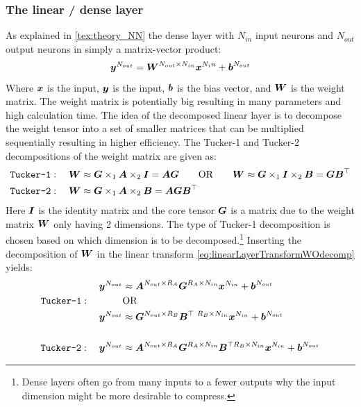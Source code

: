\subsubsection{The linear / dense layer}
As explained in \autoref{tex:theory_NN} the dense layer with $N_{in}$ input neurons and $N_{out}$ output neurons in simply a matrix-vector product:
\begin{equation}
    \boldsymbol{y}^{N_{out}} = \boldsymbol{W}^{N_{out}\times N_{in}}\boldsymbol{x}^{N_in} + \boldsymbol{b}^{N_{out}}
    \label{eq:linearLayerTransformWOdecomp}
\end{equation}
Where $\boldsymbol{x}$ is the input, $\boldsymbol{y}$ is the input, $\boldsymbol{b}$ is the bias vector, and $\boldsymbol{W}$ is the weight matrix. The weight matrix is potentially big resulting in many parameters and high calculation time. The idea of the decomposed linear layer is to decompose the weight tensor into a set of smaller matrices that can be multiplied sequentially resulting in higher efficiency. The Tucker-1 and Tucker-2 decompositions of the weight matrix are given as:
\begin{align}
\texttt{Tucker-1}&: \quad \boldsymbol{W} \approx \boldsymbol{G} \times_1 \boldsymbol{A} \times_2 \boldsymbol{I} = \boldsymbol{A}\boldsymbol{G} \qquad \text{OR} \qquad \boldsymbol{W} \approx \boldsymbol{G} \times_1 \boldsymbol{I} \times_2 \boldsymbol{B} = \boldsymbol{G}\boldsymbol{B}^\top \\
\texttt{Tucker-2}&: \quad \boldsymbol{W} \approx \boldsymbol{G} \times_1 \boldsymbol{A} \times_2 \boldsymbol{B} = \boldsymbol{A}\boldsymbol{G}\boldsymbol{B}^\top 
\end{align}
Here $\boldsymbol{I}$ is the identity matrix and the core tensor $\boldsymbol{G}$ is a matrix due to the weight matrix $\boldsymbol{W}$ only having 2 dimensions. The type of Tucker-1 decomposition is chosen based on which dimension is to be decomposed.\footnote{Dense layers often go from many inputs to a fewer outputs why the input dimension might be more desirable to compress.} Inserting the decomposition of $\boldsymbol{W}$ in the linear transform \eqref{eq:linearLayerTransformWOdecomp} yields:
\begin{align}
     \boldsymbol{y}^{N_{out}} &\approx \boldsymbol{A}^{N_{out}\times R_A} \boldsymbol{G}^{R_A\times N_{in}} \boldsymbol{x}^{N_{in}} + \boldsymbol{b}^{N_{out}} \\
    \texttt{Tucker-1}: \qquad \quad \ \ &\text{OR} \nonumber \\
    \boldsymbol{y}^{N_{out}} &\approx \boldsymbol{G}^{N_{out}\times R_B} \boldsymbol{B}^{\top \  R_B\times N_{in}}\boldsymbol{x}^{N_{in}} + \boldsymbol{b}^{N_{out}} \\
    &\quad \nonumber \\
    \texttt{Tucker-2}: \quad \boldsymbol{y}^{N_{out}} &\approx \boldsymbol{A}^{N_{out}\times R_A} \boldsymbol{G}^{R_A\times N_{in}} \boldsymbol{B}^{\top  R_B\times N_{in}}\boldsymbol{x}^{N_{in}} + \boldsymbol{b}^{N_{out}}
\end{align}
